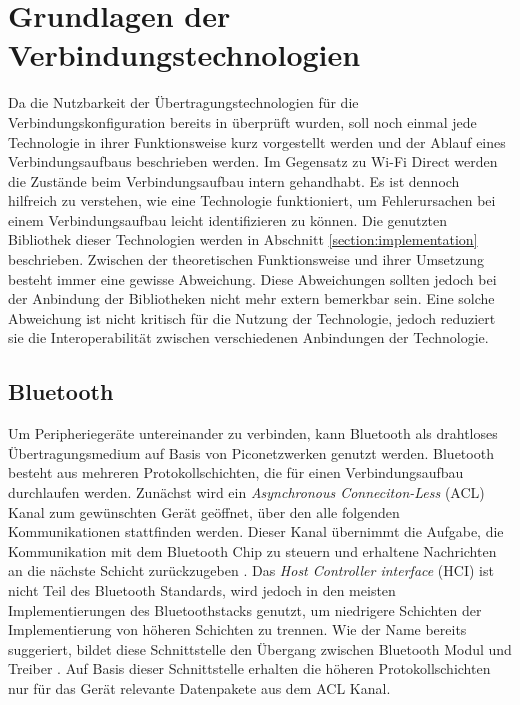 \section{Grundlagen der Verbindungstechnologien}
	Da die Nutzbarkeit der Übertragungstechnologien für die Verbindungskonfiguration bereits in \cite{aiProject} überprüft wurden, soll noch einmal jede Technologie in ihrer Funktionsweise kurz vorgestellt werden und der Ablauf eines Verbindungsaufbaus beschrieben werden. Im Gegensatz zu Wi-Fi Direct werden die Zustände beim Verbindungsaufbau intern gehandhabt. Es ist dennoch hilfreich zu verstehen, wie eine Technologie funktioniert, um Fehlerursachen bei einem Verbindungsaufbau leicht identifizieren zu können. Die genutzten Bibliothek dieser Technologien werden in Abschnitt \ref{section:implementation} beschrieben. Zwischen der theoretischen Funktionsweise und ihrer Umsetzung besteht immer eine gewisse Abweichung. Diese Abweichungen sollten jedoch bei der Anbindung der Bibliotheken nicht mehr extern bemerkbar sein. Eine solche Abweichung ist nicht kritisch für die Nutzung der Technologie, jedoch reduziert sie die Interoperabilität zwischen verschiedenen Anbindungen der Technologie.
	
	\subsection{Bluetooth}
	Um Peripheriegeräte untereinander zu verbinden, kann Bluetooth als drahtloses Übertragungsmedium auf Basis von Piconetzwerken genutzt werden.
	Bluetooth besteht aus mehreren Protokollschichten, die für einen Verbindungsaufbau durchlaufen werden. Zunächst wird ein {\it Asynchronous Conneciton-Less} (ACL) Kanal zum gewünschten Gerät geöffnet, über den alle folgenden Kommunikationen stattfinden werden. Dieser Kanal übernimmt die Aufgabe, die Kommunikation mit dem Bluetooth Chip zu steuern und erhaltene Nachrichten an die nächste Schicht zurückzugeben \cite[S.400]{Sauter}. Das {\it Host Controller interface} (HCI) ist nicht Teil des Bluetooth Standards, wird jedoch in den meisten Implementierungen des Bluetoothstacks genutzt, um niedrigere Schichten der Implementierung von höheren Schichten zu trennen. Wie der Name bereits suggeriert, bildet diese Schnittstelle den Übergang zwischen Bluetooth Modul und Treiber \cite[S.65]{miller}. Auf Basis dieser Schnittstelle erhalten die höheren Protokollschichten nur für das Gerät relevante Datenpakete aus dem ACL Kanal.
	
